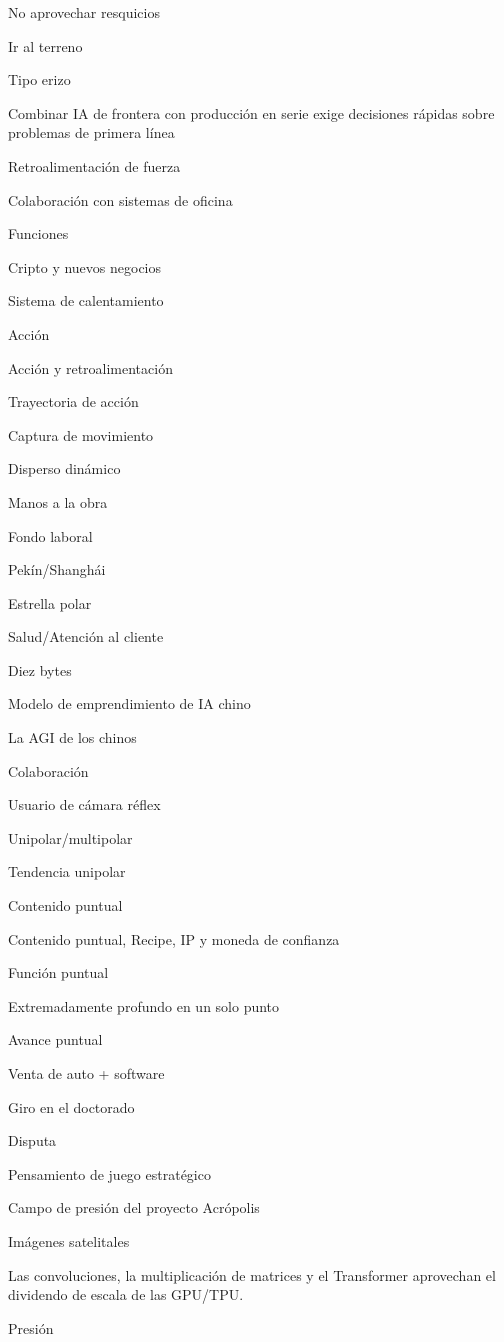 \documentclass{article}
\begin{document}
No aprovechar resquicios

Ir al terreno

Tipo erizo

Combinar IA de frontera con producción en serie exige decisiones rápidas sobre problemas de primera línea

Retroalimentación de fuerza

Colaboración con sistemas de oficina

Funciones

Cripto y nuevos negocios

Sistema de calentamiento

Acción

Acción y retroalimentación

Trayectoria de acción

Captura de movimiento

Disperso dinámico

Manos a la obra

Fondo laboral

Pekín/Shanghái

Estrella polar

Salud/Atención al cliente

Diez bytes

Modelo de emprendimiento de IA chino

La AGI de los chinos

Colaboración

Usuario de cámara réflex

Unipolar/multipolar

Tendencia unipolar

Contenido puntual

Contenido puntual, Recipe, IP y moneda de confianza

Función puntual

Extremadamente profundo en un solo punto

Avance puntual

Venta de auto + software

Giro en el doctorado

Disputa

Pensamiento de juego estratégico

Campo de presión del proyecto Acrópolis

Imágenes satelitales

Las convoluciones, la multiplicación de matrices y el Transformer aprovechan el dividendo de escala de las GPU/TPU.

Presión
\end{document}

